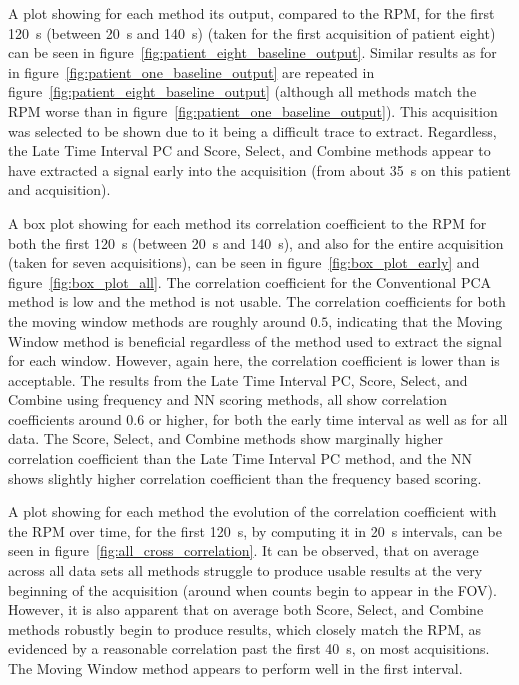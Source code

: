     A plot showing for each method its output, compared to the \gls{RPM}, for the first \SI{120}{\second} (between \SI{20}{\second} and \SI{140}{\second}) (taken for the first acquisition of patient eight) can be seen in figure~\ref{fig:patient_eight_baseline_output}. Similar results as for in figure~\ref{fig:patient_one_baseline_output} are repeated in figure~\ref{fig:patient_eight_baseline_output} (although all methods match the \gls{RPM} worse than in figure~\ref{fig:patient_one_baseline_output}). This acquisition was selected to be shown due to it being a difficult trace to extract. Regardless, the Late Time Interval \gls{PC} and Score, Select, and Combine methods appear to have extracted a signal early into the acquisition (from about \SI{35}{\second} on this patient and acquisition).
    
    A box plot showing for each method its correlation coefficient to the \gls{RPM} for both the first \SI{120}{\second} (between \SI{20}{\second} and \SI{140}{\second}), and also for the entire acquisition (taken for seven acquisitions), can be seen in figure~\ref{fig:box_plot_early} and figure~\ref{fig:box_plot_all}. The correlation coefficient for the Conventional \gls{PCA} method is low and the method is not usable. The correlation coefficients for both the moving window methods are roughly around $0.5$, indicating  that the Moving Window method is beneficial regardless of the method used to extract the signal for each window. However, again here, the correlation coefficient is lower than is acceptable. The results from the Late Time Interval \gls{PC}, Score, Select, and Combine using frequency and \gls{NN} scoring methods, all show correlation coefficients around $0.6$ or higher, for both the early time interval as well as for all data. The Score, Select, and Combine methods show marginally higher correlation coefficient than the Late Time Interval \gls{PC} method, and the \gls{NN} shows slightly higher correlation coefficient than the frequency based scoring.
    
    A plot showing for each method the evolution of the correlation coefficient with the \gls{RPM} over time, for the first \SI{120}{\second}, by computing it in \SI{20}{\second} intervals, can be seen in figure~\ref{fig:all_cross_correlation}. It can be observed, that on average across all data sets all methods struggle to produce usable results at the very beginning of the acquisition (around when counts begin to appear in the \gls{FOV}). However, it is also apparent that on average both Score, Select, and Combine methods robustly begin to produce results, which closely match the \gls{RPM}, as evidenced by a reasonable correlation past the first \SI{40}{\second}, on most acquisitions. The Moving Window method appears to perform well in the first interval.
    
